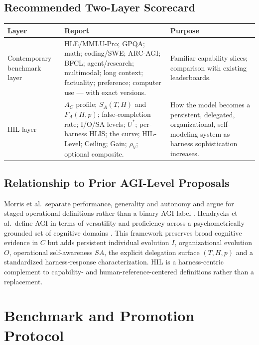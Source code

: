 \documentclass[11pt]{article}
\theoremstyle{definition}
\newcommand{\SA}{\ensuremath{S_A(T,H)}}
\newcommand{\FA}{\ensuremath{F_A(H,p)}}
\newcommand{\rhov}{\ensuremath{\rho_V}}
\begin{document}
\subsection{Recommended Two-Layer Scorecard}

\begin{table}[h]
\centering\small
\begin{tabularx}{\textwidth}{@{}lYY@{}}
\toprule
Layer & Report & Purpose \\
\midrule
Contemporary benchmark layer & HLE/MMLU-Pro; GPQA; math; coding/SWE; ARC-AGI; BFCL; agent/research; multimodal; long context; factuality; preference; computer use --- with exact versions. & Familiar capability slices; comparison with existing leaderboards. \\
HIL layer & $A_C$ profile; \SA{} and \FA{}; false-completion rate; I/O/SA levels; $U^{*}$; per-harness HLIS; the curve; HIL-Level; Ceiling; Gain; \rhov{}; optional composite. & How the model becomes a persistent, delegated, organizational, self-modeling system as harness sophistication increases. \\
\bottomrule
\end{tabularx}
\end{table}

\subsection{Relationship to Prior AGI-Level Proposals}

Morris et al.\ separate performance, generality and autonomy and argue for staged operational definitions rather than a binary AGI label \citep{morris2024levels}. Hendrycks et al.\ define AGI in terms of versatility and proficiency across a psychometrically grounded set of cognitive domains \citep{hendrycks2025agi}. This framework preserves broad cognitive evidence in $C$ but adds persistent individual evolution $I$, organizational evolution $O$, operational self-awareness $SA$, the explicit delegation surface $(T,H,p)$ and a standardized harness-response characterization. HIL is a harness-centric complement to capability- and human-reference-centered definitions rather than a replacement.

\section{Benchmark and Promotion Protocol}\label{sec:protocol}
\end{document}

